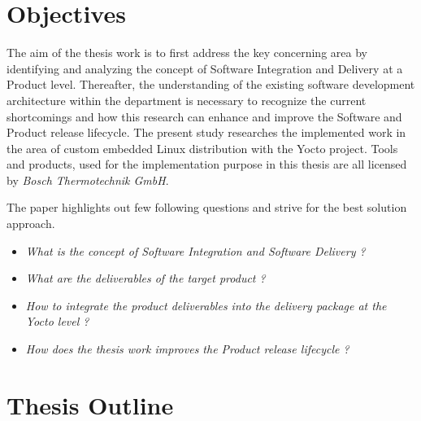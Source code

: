\newpage
\section{Objectives}

The aim of the thesis work is to first address the key concerning area by identifying and analyzing the concept of Software Integration and Delivery at a Product level. Thereafter, the understanding of the existing software development architecture within the department is necessary to recognize the current shortcomings and how this research can enhance and improve the Software and Product release lifecycle. The present study researches the implemented work in the area of custom embedded Linux distribution with the Yocto project. Tools and products, used for the implementation purpose in this thesis are all licensed by \emph{Bosch Thermotechnik GmbH}.

\vspace{0.2cm}
The paper highlights out few following questions and strive for the best  solution approach.  
\vspace{0.2cm}
\begin{itemize}

\item \emph{What is the concept of Software Integration and Software Delivery ?}
\item \emph{What are the deliverables of the target product ?}
\item \emph{How to integrate the product deliverables into the delivery package at the Yocto level ?}
\item \emph{How does the thesis work improves the Product release lifecycle ?}
\end{itemize}


\section{Thesis Outline}

